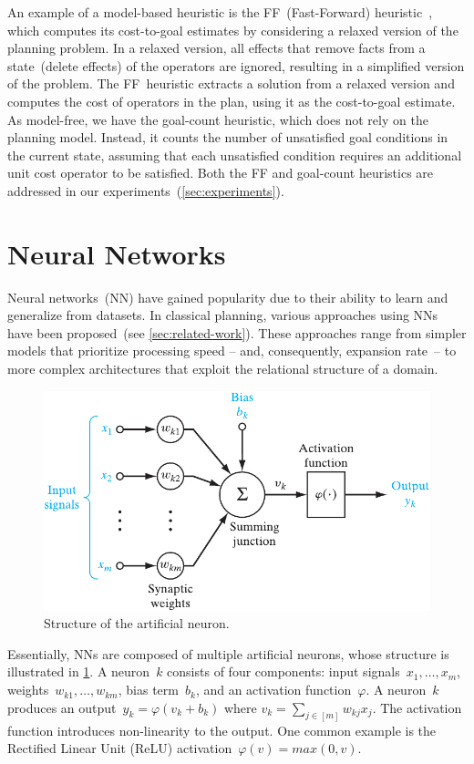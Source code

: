 An example of a model-based heuristic is the FF~(Fast-Forward) heuristic~\cite{Hoffmann.Nebel/2001}, which computes its cost-to-goal estimates by considering a relaxed version of the planning problem. In a relaxed version, all effects that remove facts from a state~(delete effects) of the operators are ignored, resulting in a simplified version of the problem. The FF~heuristic extracts a solution from a relaxed version and computes the cost of operators in the plan, using it as the cost-to-goal estimate. As model-free, we have the goal-count heuristic, which does not rely on the planning model. Instead, it counts the number of unsatisfied goal conditions in the current state, assuming that each unsatisfied condition requires an additional unit cost operator to be satisfied. Both the FF and goal-count heuristics are addressed in our experiments~(\cref{sec:experiments}).

\section{Neural Networks}
\label{sec:neural-networks}

Neural networks~(NN) have gained popularity due to their ability to learn and generalize from datasets. In classical planning, various approaches using NNs have been proposed~(see \cref{sec:related-work}). These approaches range from simpler models that prioritize processing speed -- and, consequently, expansion rate~-- to more complex architectures that exploit the relational structure of a domain.

\begin{figure}[ht]
    \caption{Structure of the artificial neuron.}
    \label{fig:neuron}
    \addmargin
    \centering
    \includegraphics[width=0.8\linewidth]{figures/neuron.pdf}
    \addmargin
\end{figure}

Essentially, NNs are composed of multiple artificial neurons, whose structure is illustrated in \cref{fig:neuron}. A neuron~$k$ consists of four components: input signals~$x_1,\ldots,x_m$, weights~$w_{k1},\ldots,w_{km}$, bias term~$b_k$, and an activation function~$\varphi$. A neuron~$k$ produces an output~$y_k = \varphi(v_k + b_k)$ where $v_k = \sum_{j \in [m]} w_{kj} x_j$. The activation function introduces non-linearity to the output. One common example is the Rectified Linear Unit (ReLU) activation~$\varphi(v) = max(0,v)$.

